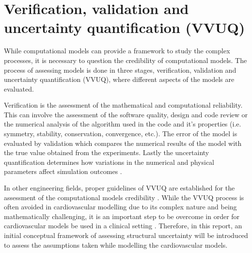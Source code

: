 \section{Verification, validation and uncertainty quantification (VVUQ)}
While computational models can provide a framework to study the complex processes, it is necessary to question the credibility of computational models. The process of assessing models is done in three stages, verification, validation and uncertainty quantification (VVUQ), where different aspects of the models are evaluated. \par

Verification is the assessment of the mathematical and computational reliability. This can involve the assessment of the software quality, design and code review or the numerical analysis of the algorithm used in the code and it's properties (i.e. symmetry, stability, conservation, convergence, etc.). The error of the model is evaluated by validation which compares the numerical results of the model with the true value obtained from the experiments. Lastly the uncertainty quantification determines how variations in the numerical and physical parameters affect simulation outcomes \cite{VerificationASME}.

In other engineering fields, proper guidelines of VVUQ are established for the assessment of the computational models credibility \cite{VerificationASME}. While the VVUQ process is often avoided in cardiovascular modelling due to its complex nature and being mathematically challenging, it is an important step to be overcome in order for cardiovascular models be used in a clinical setting \cite{Steinman2018Editorial:Utility}. Therefore, in this report, an initial conceptual framework of assessing structural uncertainty will be introduced to assess the assumptions taken while modelling the cardiovascular models.
